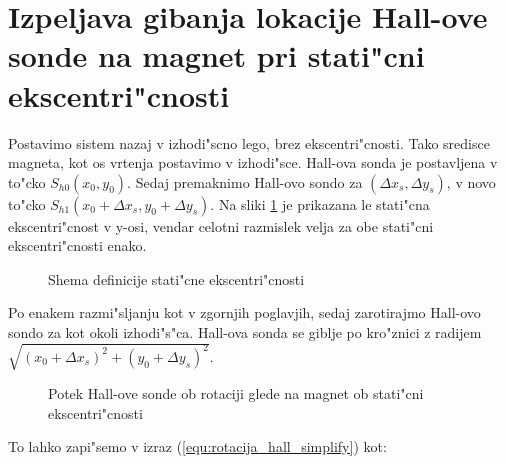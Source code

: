 \section{Izpeljava gibanja lokacije Hall-ove sonde na magnet pri stati"cni ekscentri"cnosti}


Postavimo sistem nazaj v izhodi"scno lego, brez ekscentri"cnosti. Tako sredisce magneta, kot os vrtenja postavimo v izhodi"sce. Hall-ova sonda je postavljena v to"cko $S_{h0}(x_0,y_0)$. Sedaj premaknimo Hall-ovo sondo za $(\Delta x_s, \Delta y_s)$, v novo to"cko $S_{h1}(x_0+\Delta x_s, y_0+\Delta y_s)$. Na sliki \ref{fig:def_sta_eks} je prikazana le stati"cna ekscentri"cnost v y-osi, vendar celotni razmislek velja za obe stati"cni ekscentri"cnosti enako.


\begin{figure}[h!]
	\centering
	\caption{Shema definicije stati"cne ekscentri"cnosti}
	\label{fig:def_sta_eks}
\end{figure}

Po enakem razmi"sljanju kot v zgornjih poglavjih, sedaj zarotirajmo Hall-ovo sondo za kot \kol{-\theta} okoli izhodi"s"ca. Hall-ova sonda se giblje po kro"znici z radijem $\sqrt{(x_0+\Delta x_s)^2+(y_0+\Delta y_s)^2}$.


\begin{figure}[h!]
	\centering
	\caption{Potek Hall-ove sonde ob rotaciji glede na magnet ob stati"cni ekscentri"cnosti}
	\label{fig:def_sta_eks_stat}
\end{figure}


To lahko zapi"semo v izraz (\ref{equ:rotacija_hall_simplify}) kot:


